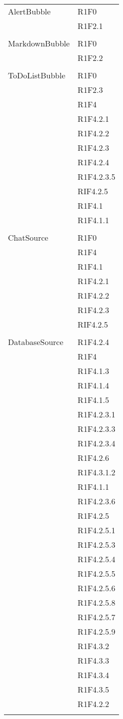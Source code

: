 \begin{center}
\begin{longtable}{|p{7cm}|p{5cm}|}
		AlertBubble & R1F0 \\ & R1F2.1 \\ & \\ \hline
		MarkdownBubble & R1F0 \\ & R1F2.2 \\ & \\ \hline
		ToDoListBubble & R1F0 \\ & R1F2.3 \\ & R1F4 \\ & R1F4.2.1 \\ & R1F4.2.2 \\ & R1F4.2.3 \\ & R1F4.2.4 \\ & R1F4.2.3.5 \\ & RIF4.2.5 \\ & R1F4.1 \\ & R1F4.1.1 \\ & \\ \hline
		ChatSource & R1F0 \\ & R1F4 \\ & R1F4.1 \\ & R1F4.2.1 \\ & R1F4.2.2 \\ & R1F4.2.3 \\ & RIF4.2.5 \\ & \\ \hline
		DatabaseSource & R1F4.2.4 \\ & R1F4 \\ & R1F4.1.3 \\ & R1F4.1.4 \\ & R1F4.1.5 \\ & R1F4.2.3.1 \\ & R1F4.2.3.3 \\ & R1F4.2.3.4 \\ & R1F4.2.6 \\ & R1F4.3.1.2 \\ & R1F4.1.1 \\ & R1F4.2.3.6 \\ & R1F4.2.5 \\ & R1F4.2.5.1 \\ & R1F4.2.5.3 \\ & R1F4.2.5.4 \\ & R1F4.2.5.5 \\ & R1F4.2.5.6 \\ & R1F4.2.5.8 \\ & R1F4.2.5.7 \\ & R1F4.2.5.9 \\ & R1F4.3.2 \\ & R1F4.3.3 \\ & R1F4.3.4 \\ & R1F4.3.5 \\ & R1F4.2.2 \\ & \\ \hline

\end{longtable}
\end{center}

